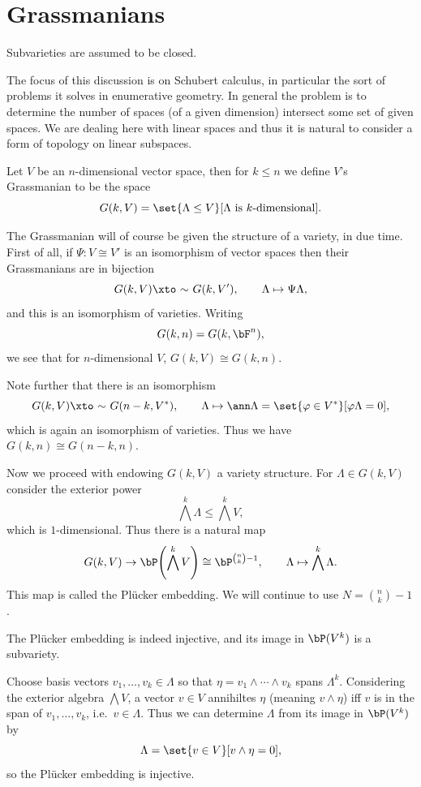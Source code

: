 \section{Grassmanians}

\bnote

    Subvarieties are assumed to be closed.

\enote

The focus of this discussion is on Schubert calculus, in particular the sort of problems it solves in
enumerative geometry.
In general the problem is to determine the number of spaces (of a given dimension) intersect some set
of given spaces.
We are dealing here with linear spaces and thus it is natural to consider a form of topology on linear
subspaces.

\bdefn

    Let $V$ be an $n$-dimensional vector space, then for $k\leq n$ we define $V$'s {\emphcolor Grassmanian}
    to be the space
    $$ G(k,V) = \set{\Lambda\leq V}[\hbox{$\Lambda$ is $k$-dimensional}] . $$

\edefn

The Grassmanian will of course be given the structure of a variety, in due time.
First of all, if $\Psi\colon V\cong V'$ is an isomorphism of vector spaces then their Grassmanians are in
bijection
$$ G(k,V) \lisoto G(k,V'),\qquad \Lambda\mapsto\Psi\Lambda , $$
and this is an isomorphism of varieties.
Writing
$$ G(k,n) = G(k,\bF^n) , $$
we see that for $n$-dimensional $V$, $G(k,V)\cong G(k,n)$.

Note further that there is an isomorphism
$$ G(k,V) \lisoto G(n-k,V^*),\qquad \Lambda\mapsto\ann\Lambda = \set{\phi\in V^*}[\phi\Lambda=0] , $$
which is again an isomorphism of varieties.
Thus we have $G(k,n)\cong G(n-k,n)$.

Now we proceed with endowing $G(k,V)$ a variety structure.
For $\Lambda\in G(k,V)$ consider the exterior power
$$ \bigwedge^k\Lambda \leq \bigwedge^kV , $$
which is $1$-dimensional.
Thus there is a natural map
$$ G(k,V) \to \bP\parens{\bigwedge^kV} \cong \bP^{\binom nk-1},\qquad \Lambda \mapsto \bigwedge^k\Lambda . $$
This map is called the {\emphcolor Pl\"ucker embedding}.
We will continue to use $N=\binom nk-1$.

\blemm

    The Pl\"ucker embedding is indeed injective, and its image in $\bP(V^k)$ is a subvariety.

\elemm

\bproof

    Choose basis vectors $v_1,\dots,v_k\in\Lambda$ so that $\eta=v_1\wedge\cdots\wedge v_k$ spans
    $\Lambda^k$.
    Considering the exterior algebra $\bigwedge V$, a vector $v\in V$ annihiltes $\eta$ (meaning
    $v\wedge\eta$) iff $v$ is in the span of $v_1,\dots,v_k$, i.e.\ $v\in\Lambda$.
    Thus we can determine $\Lambda$ from its image in $\bP(V^k)$ by
    $$ \Lambda = \set{v\in V}[v\wedge\eta=0] , $$
    so the Pl\"ucker embedding is injective.

